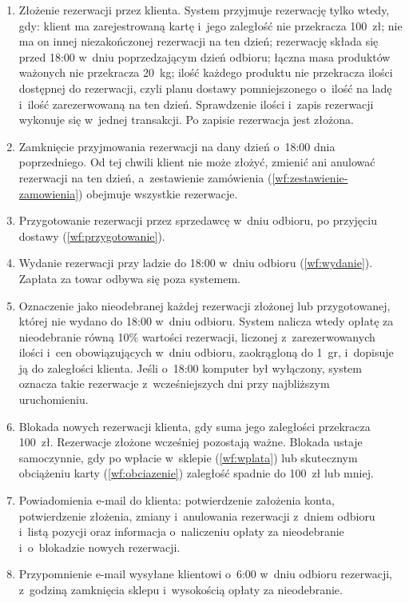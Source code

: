 \documentclass[12pt,a4paper,oneside]{article}
\newcounter{pu}
\begin{document}
\begin{enumerate}[resume*=wf]
	\item \label{wf:proc-zlozenie} Złożenie rezerwacji przez klienta. System przyjmuje rezerwację tylko wtedy, gdy: klient ma zarejestrowaną kartę i~jego zaległość nie przekracza 100~zł; nie ma on innej niezakończonej rezerwacji na ten dzień; rezerwację składa się przed 18:00 w~dniu poprzedzającym dzień odbioru; łączna masa produktów ważonych nie przekracza 20~kg; ilość każdego produktu nie przekracza ilości dostępnej do rezerwacji, czyli planu dostawy pomniejszonego o~ilość na ladę i~ilość zarezerwowaną na ten dzień. Sprawdzenie ilości i~zapis rezerwacji wykonuje się w~jednej transakcji. Po zapisie rezerwacja jest złożona.
	\item \label{wf:proc-zamkniecie} Zamknięcie przyjmowania rezerwacji na dany dzień o~18:00 dnia poprzedniego. Od tej chwili klient nie może złożyć, zmienić ani anulować rezerwacji na ten dzień, a~zestawienie zamówienia (\ref{wf:zestawienie-zamowienia}) obejmuje wszystkie rezerwacje.
	\item \label{wf:proc-przygotowanie} Przygotowanie rezerwacji przez sprzedawcę w~dniu odbioru, po przyjęciu dostawy (\ref{wf:przygotowanie}).
	\item \label{wf:proc-wydanie} Wydanie rezerwacji przy ladzie do 18:00 w~dniu odbioru (\ref{wf:wydanie}). Zapłata za towar odbywa się poza systemem.
	\item \label{wf:proc-nieodebrana} Oznaczenie jako nieodebranej każdej rezerwacji złożonej lub przygotowanej, której nie wydano do 18:00 w~dniu odbioru. System nalicza wtedy opłatę za nieodebranie równą 10\% wartości rezerwacji, liczonej z~zarezerwowanych ilości i~cen obowiązujących w~dniu odbioru, zaokrągloną do 1~gr, i~dopisuje ją do zaległości klienta. Jeśli o~18:00 komputer był wyłączony, system oznacza takie rezerwacje z~wcześniejszych dni przy najbliższym uruchomieniu.
	\item \label{wf:proc-blokada} Blokada nowych rezerwacji klienta, gdy suma jego zaległości przekracza 100~zł. Rezerwacje złożone wcześniej pozostają ważne. Blokada ustaje samoczynnie, gdy po wpłacie w~sklepie (\ref{wf:wplata}) lub skutecznym obciążeniu karty (\ref{wf:obciazenie}) zaległość spadnie do 100~zł lub mniej.
	\item \label{wf:powiadomienia} Powiadomienia e-mail do klienta: potwierdzenie założenia konta, potwierdzenie złożenia, zmiany i~anulowania rezerwacji z~dniem odbioru i~listą pozycji oraz informacja o~naliczeniu opłaty za nieodebranie i~o~blokadzie nowych rezerwacji.
	\item \label{wf:przypomnienie} Przypomnienie e-mail wysyłane klientowi o~6:00 w~dniu odbioru rezerwacji, z~godziną zamknięcia sklepu i~wysokością opłaty za nieodebranie.
\end{enumerate}
\end{document}
